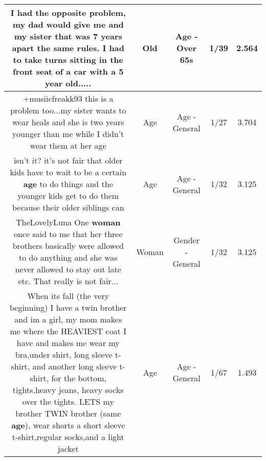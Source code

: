 \documentclass[11pt]{article}
\newlength\mylength
\begin{document}
\begin{center}
\begin{longtable}{|C{.65\mylength}|C{.30\mylength}|C{.12\mylength}|C{.12\mylength}|C{.12\mylength}|}
  \small I had the opposite problem, my dad would give me and my sister that was 7 years apart the same rules. I had to take turns sitting in the front seat of a car with a 5 year \textbf{old}.....\normalsize   & Old & Age - Over 65s & 1/39 & 2.564 \\  \hline
  \small +musiicfreakk93 this is a problem too...my sister wants to wear heals and she is two years younger than me while I didn't wear them at her age\normalsize   & Age & Age - General & 1/27 & 3.704 \\  \hline
  \small isn't it? it's not fair that older kids have to wait to be a certain \textbf{age} to do things and the younger kids get to do them because their older siblings can\normalsize   & Age & Age - General & 1/32 & 3.125 \\  \hline
  \small TheLovelyLuna One \textbf{woman} once said to me that her three brothers basically were allowed to do anything and she was never allowed to stay out late etc. That really is not fair...\normalsize   & Woman & Gender - General & 1/32 & 3.125 \\  \hline
  \small When its fall (the very beginning) I have a twin brother and im a girl, my mom makes me where the HEAVIEST coat I have and makes me wear my bra,under shirt, long sleeve t-shirt, and another long sleeve t-shirt, for the bottom, tights,heavy jeans, heavy socks over the tights. LETS my brother TWIN brother (same \textbf{age}), wear shorts a short sleeve t-shirt,regular socks,and a light jacket\normalsize   & Age & Age - General & 1/67 & 1.493 \\  \hline

\end{longtable}
\end{center}
\end{document}
